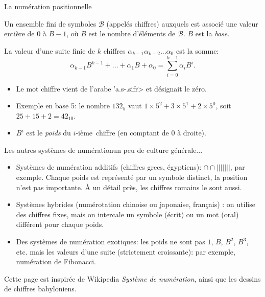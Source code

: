 \begin{frame}{La numération positionnelle}
  \begin{definition}
    Un ensemble fini de symboles $\mathcal{B}$ (appelés chiffres)
    auxquels est associé une valeur entière de $0$ à $B-1$, où $B$ est
    le nombre d'éléments de $\mathcal{B}$. $B$ est la \emph{base}.
    
    La valeur d'une suite finie de $k$ chiffres
    $\alpha_{k-1}\alpha_{k-2}...\alpha_{0}$ est la somme:
    $$\alpha_{k-1}B^{k-1}+\dots+\alpha_{1}B+\alpha_{0}=
    \sum_{i=0}^{k-1}\alpha_{i}B^i.$$
  \end{definition}

  \begin{itemize}
  \item Le mot chiffre vient de l'arabe \transtrue \<'a.s-.sifr> et
    désignait le zéro.
  \item Exemple en base 5: le nombre $132_5$ vaut $1\times
    5^2+3\times5^1+2\times 5^0$, soit $25+15+2=42_{10}$.
  \item $B^i$ est le \emph{poids} du $i$-ième\ chiffre (en comptant de 0
    à droite).
  \end{itemize}
\end{frame}
\begin{frame}{Les autres systèmes de numération}{un peu de culture générale...}
  \begin{itemize}
  \item Systèmes de numération additifs (chiffres grecs, égyptiens):
    $\cap\cap|||||||$, par exemple. Chaque poids est représenté par un
    symbole distinct, la position n'est pas importante. À un détail
    près, les chiffres romains le sont aussi.
  \item Systèmes hybrides (numérotation chinoise ou japonaise, français)
    : on utilise des chiffres fixes, mais on intercale un symbole
    (écrit) ou un mot (oral) différent pour chaque poids.
  \item Des systèmes de numération exotiques: les poids ne sont pas $1$,
    $B$, $B^2$, $B^3$, etc. mais les valeurs d'une suite (strictement
    croissante): par exemple, numération de Fibonacci.
  \end{itemize}
  
  {\small  Cette page est inspirée de Wikipedia \emph{Système de numération},
    ainsi que les dessins de chiffres babyloniens.}
\end{frame}
